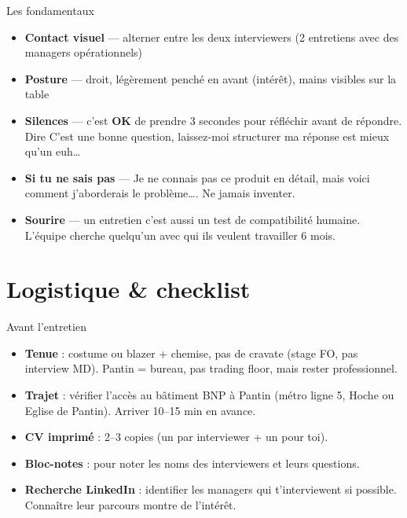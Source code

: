 \documentclass[11pt,a4paper]{article}
\begin{document}
\begin{goodbox}{Les fondamentaux}
\begin{itemize}[nosep, leftmargin=12pt]
\item \textbf{Contact visuel} --- alterner entre les deux interviewers (2 entretiens avec des managers op\'erationnels)
\item \textbf{Posture} --- droit, l\'eg\`erement pench\'e en avant (int\'er\^et), mains visibles sur la table
\item \textbf{Silences} --- c'est \textbf{OK} de prendre 3 secondes pour r\'efl\'echir avant de r\'epondre.
      Dire \og C'est une bonne question, laissez-moi structurer ma r\'eponse \fg{} est mieux qu'un \og euh\ldots \fg{}
\item \textbf{Si tu ne sais pas} --- \og Je ne connais pas ce produit en d\'etail, mais
      voici comment j'aborderais le probl\`eme\ldots \fg{}. Ne jamais inventer.
\item \textbf{Sourire} --- un entretien c'est aussi un test de compatibilit\'e humaine.
      L'\'equipe cherche quelqu'un avec qui ils veulent travailler 6 mois.
\end{itemize}
\end{goodbox}

\vspace{8pt}

\section{Logistique \& checklist}

\begin{graybox}{Avant l'entretien}
\begin{itemize}[nosep, leftmargin=12pt]
\item[$\square$] \textbf{Tenue} : costume ou blazer + chemise, pas de cravate (stage FO, pas interview MD).
      Pantin = bureau, pas trading floor, mais rester professionnel.
\item[$\square$] \textbf{Trajet} : v\'erifier l'acc\`es au b\^atiment BNP \`a Pantin (m\'etro ligne 5,
      Hoche ou Eglise de Pantin). Arriver 10--15 min en avance.
\item[$\square$] \textbf{CV imprim\'e} : 2--3 copies (un par interviewer + un pour toi).
\item[$\square$] \textbf{Bloc-notes} : pour noter les noms des interviewers et leurs questions.
\item[$\square$] \textbf{Recherche LinkedIn} : identifier les managers qui t'interviewent si possible.
      Conna\^itre leur parcours montre de l'int\'er\^et.
\end{itemize}
\end{graybox}
\end{document}
